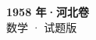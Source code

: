 \documentclass[zihao=-4, a4paper]{ctexart}
\begin{document}
\begin{center}
  {\Large\bfseries 1958 年·河北卷}\\[4pt]
  {\large 数学 · 试题版}
\end{center}
\medskip
{}

\end{document}
